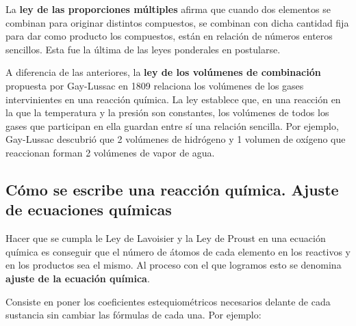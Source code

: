 \documentclass[
  spanish,
]{article}
\begin{document}
La \textbf{ley de las proporciones múltiples} afirma que cuando dos
elementos se combinan para originar distintos compuestos, se combinan
con dicha cantidad fija para dar como producto los compuestos, están en
relación de números enteros sencillos. Esta fue la última de las leyes
ponderales en postularse.

A diferencia de las anteriores, la \textbf{ley de los volúmenes de
combinación} propuesta por Gay-Lussac en 1809 relaciona los volúmenes de
los gases intervinientes en una reacción química. La ley establece que,
en una reacción en la que la temperatura y la presión son constantes,
los volúmenes de todos los gases que participan en ella guardan entre sí
una relación sencilla. Por ejemplo, Gay-Lussac descubrió que 2 volúmenes
de hidrógeno y 1 volumen de oxígeno que reaccionan forman 2 volúmenes de
vapor de agua.

\hfill{}

\hypertarget{cuxf3mo-se-escribe-una-reacciuxf3n-quuxedmica.-ajuste-de-ecuaciones-quuxedmicas}{%
\subsection{Cómo se escribe una reacción química. Ajuste de ecuaciones
químicas}\label{cuxf3mo-se-escribe-una-reacciuxf3n-quuxedmica.-ajuste-de-ecuaciones-quuxedmicas}}

Hacer que se cumpla le Ley de Lavoisier y la Ley de Proust en una
ecuación química es conseguir que el número de átomos de cada elemento
en los reactivos y en los productos sea el mismo. Al proceso con el que
logramos esto se denomina \textbf{ajuste de la ecuación química}.

Consiste en poner los coeficientes estequiométricos necesarios delante
de cada sustancia sin cambiar las fórmulas de cada una. Por ejemplo:


\end{document}

